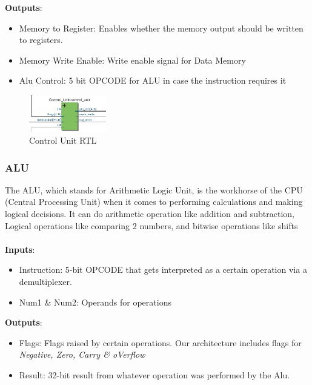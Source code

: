 \documentclass[9pt,a4paper,twoside]{tau}
\begin{document}
    \textbf{Outputs}:
    \begin{itemize}
        \item Memory to Register: Enables whether the memory output should be written to registers.
        \item Memory Write Enable: Write enable signal for Data Memory
        \item Alu Control: 5 bit OPCODE for ALU in case the instruction requires it
    \end{itemize}
    


    \begin{figure}[h]  %
        \centering  %
        \includegraphics[width=0.3\textwidth]{images/CUImg.png}
        \caption{Control Unit RTL}
        \label{fig:Control Unit RTL}
    \end{figure}



\subsubsection{ALU}
    The ALU, which stands for Arithmetic Logic Unit, is the workhorse of the CPU (Central Processing Unit)  when it comes to performing calculations and making logical decisions. It can do arithmetic operation like addition and subtraction, Logical operations like comparing 2 numbers, and bitwise operations like shifts\\ \\

    \textbf{Inputs}:
    \begin{itemize}
        \item Instruction: 5-bit OPCODE that gets interpreted as a certain operation via a demultiplexer.
        \item Num1 \& Num2: Operands for operations
    \end{itemize}
    
    \textbf{Outputs}:
    \begin{itemize}
        \item Flags: Flags raised by certain operations. Our architecture includes flags for \textit{Negative, Zero, Carry \& oVerflow}
        \item Result: 32-bit result from whatever operation was performed by the Alu.
    \end{itemize}
    
\end{document}
